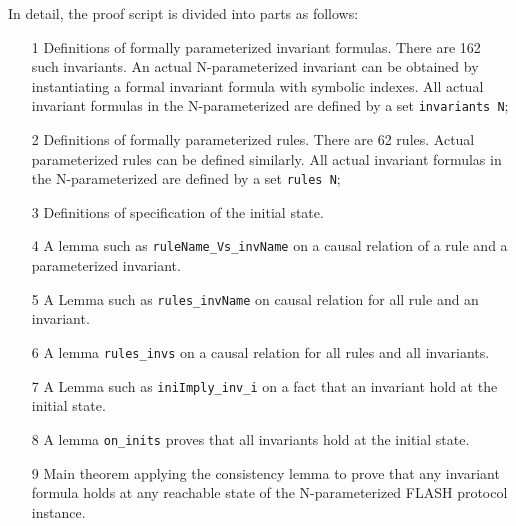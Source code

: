 \documentclass{llncs}
\begin{document}
In detail, the proof script is divided into   parts as follows:
\begin{enumerate}
\item[1] Definitions of formally parameterized invariant formulas.%
    There are 162 such invariants. An actual N-parameterized invariant can be obtained by instantiating a formal invariant formula with symbolic indexes. All   actual invariant formulas in the N-parameterized are defined by a set {\tt invariants N};

\item[2] Definitions of formally parameterized rules. There are 62 rules. %
    Actual parameterized rules can be defined similarly. All actual invariant formulas in the N-parameterized are defined by a set {\tt rules N};

\item[3]  Definitions of specification of the initial state. %

\item[4] A lemma  such as {\tt ruleName\_Vs\_invName} on a causal relation of a rule and a parameterized invariant. %


\item[5]  A  Lemma  such as {\tt rules\_invName} on causal relation for  all rule and an invariant.%


\item[6] A lemma {\tt rules\_invs} on a causal relation for all rules and all invariants. %

\item[7] A Lemma such as {\tt iniImply\_inv\_i} on a fact that an invariant  hold at the initial state. %

\item[8] A lemma {\tt on\_inits} proves that  all invariants hold at the initial state. %

\item[9] Main theorem  applying the consistency lemma to prove that any invariant formula  holds at any reachable state of the  N-parameterized FLASH protocol instance.
\end{enumerate}
\end{document}
